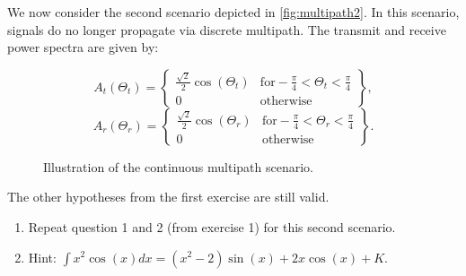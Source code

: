 \documentclass [a4paper, 11pt] {article}
\begin{document}
    \begin{exercise}{2}
    
         We now consider the second scenario depicted in \autoref{fig:multipath2}. In this scenario, signals do no longer propagate via discrete multipath. The transmit and receive power spectra are given by: 
    
    \vspace{-0.5 cm}
    \begin{multicols}{2}
      \begin{equation}
          A_t(\Theta_t) = \left\{
        \begin{array}{ll}
            \frac{\sqrt{2}}{2}\cos(\Theta_t) & \mbox{for} -\frac{\pi}{4} < \Theta_t < \frac{\pi}{4}\\
            0 & \mbox{otherwise}
        \end{array}
        \right \},
      \end{equation}\break
      \begin{equation}
          A_r(\Theta_r) = \left\{
        \begin{array}{ll}
            \frac{\sqrt{2}}{2}\cos(\Theta_r) & \mbox{for} -\frac{\pi}{4} < \Theta_r < \frac{\pi}{4}\\
            0 & \mbox{otherwise}
        \end{array}
        \right\}.
      \end{equation}
    \end{multicols}
        
        \begin{figure}[H]
        \centering
        
        \caption{Illustration of the continuous multipath scenario.}
        \label{fig:multipath2}
        \end{figure}
        
            
    The other hypotheses from the first exercise are still valid.
    
    \begin{enumerate}
        \item Repeat question 1 and 2 (from exercise 1) for this second scenario. 
        \item[] Hint: $\int x^2\cos(x) dx = (x^2-2)\sin(x)+2x\cos(x) + K$.
    \end{enumerate}
        
    \end{exercise}
    
\end{document}
